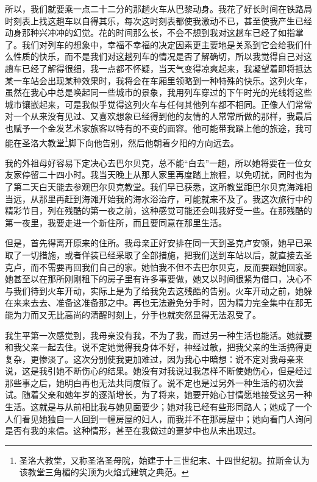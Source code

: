 \par 所以，我们就要乘一点二十二分的那趟火车从巴黎动身。我花了好长时间在铁路局时刻表上找这趟车以自得其乐，每次这时刻表都使我激动不已，甚至使我产生已经动身那种兴冲冲的幻觉。花的时间那么长，不会不想到我对这趟车已经了如指掌了。我们对列车的想象中，幸福不幸福的决定因素更主要地是关系到它会给我们什么性质的快乐，而不是我们对这趟列车的情况是否了解确切，所以我觉得自己对这趟车已经了解得很细，我一点都不怀疑，当天气变得凉爽起来，我凝望着即将抵达某一车站会出现某种效果时，我将会在车厢里领略到一种特殊的快乐。这列火车，虽然在我心中总是唤起同一些城市的景象，我用列车穿过的下午时光的光线将这些城市镶嵌起来，可是我似乎觉得这列火车与任何其他列车都不相同。正像人们常常对一个从来没有见过、又喜欢想象已经得到他的友情的人常常所做的那样，我最后也赋予一个金发艺术家旅客以特有的不变的面容。他可能带我踏上他的旅途，我可能在圣洛大教堂\footnote{圣洛大教堂，又称圣洛圣母院，始建于十三世纪末、十四世纪初。拉斯金认为该教堂三角楣的尖顶为火焰式建筑之典范。}脚下向他告别，然后他朝着夕阳的方向远去。
\par 我的外祖母好容易下定决心去巴尔贝克，总不能“白去”一趟，所以她将要在一位女友家停留二十四小时。我当天晚上从那人家里再度踏上旅程，以免叨扰，同时也为了第二天白天能去参观巴尔贝克教堂。我们早已获悉，这所教堂距巴尔贝克海滩相当远，从那里再赶到海滩开始我的海水浴治疗，可能就来不及了。我这次旅行中的精彩节目，列在残酷的第一夜之前，这种感觉可能还会叫我好受一些。在那残酷的第一夜里，我要走进一个新住所，而且要同意在那里生活。
\par 但是，首先得离开原来的住所。我母亲正好安排在同一天到圣克卢安顿，她早已采取了一切措施，或者佯装已经采取了全部措施，把我们送到车站以后，就直接去圣克卢，而不需要再回我们自己的家。她怕我不但不去巴尔贝克，反而要跟她回家。她甚至以在那所刚刚租下的房子里有许多事要做，她又以时间很紧为借口，决心不与我们待到火车开动，实际上是为了给我免去这残酷的告别。火车开动之前，她躲在来来去去、准备这准备那之中。再也无法避免分手时，因为精力完全集中在那无能为力而又无比高尚的清醒时刻上，分手也就突然显得无法忍受了。
\par 我生平第一次感觉到，我母亲没有我，不为了我，而过另一种生活也能活。她就要和我父亲一起去住。说不定她觉得我身体不好，神经过敏，把我父亲的生活搞得更复杂，更惨淡了。这次分别使我更加难过，因为我心中暗想：说不定对我母亲来说，这是我引她不断伤心的结果。她没有对我说过我怎样不断使她伤心，但是经过那些事之后，她明白再也无法共同度假了。说不定也是过另外一种生活的初次尝试。随着父亲和她年岁的逐渐增长，为了将来，她要开始心甘情愿地接受这另一种生活。这就是与从前相比我与她见面要少；她对我已经有些形同路人；她成了一个人们看见她独自一人回到一幢房屋的妇人，而我并不在那房屋中；她向看门人询问是否有我的来信。这种情形，甚至在我做过的噩梦中也从未出现过。
